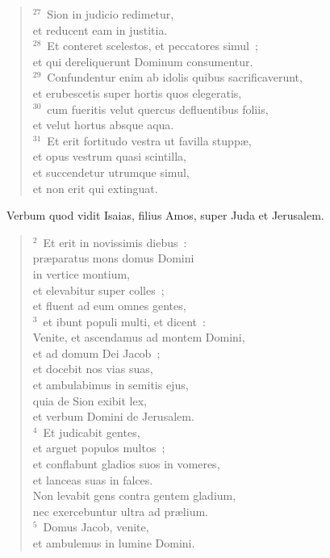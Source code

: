 \begin{flushleft}
\begin{verse}
${}^{27}$~Sion in judicio redimetur,\\ et reducent eam in justitia.\\
${}^{28}$~Et conteret scelestos, et peccatores simul~;\\ et qui dereliquerunt Dominum consumentur.\\
${}^{29}$~Confundentur enim ab idolis quibus sacrificaverunt,\\ et erubescetis super hortis quos elegeratis,\\
${}^{30}$~cum fueritis velut quercus defluentibus foliis,\\ et velut hortus absque aqua.\\
${}^{31}$~Et erit fortitudo vestra ut favilla stupp\ae ,\\ et opus vestrum quasi scintilla,\\ et succendetur utrumque simul,\\ et non erit qui extinguat.\end{verse}\end{flushleft}


~Verbum quod vidit Isaias, filius Amos, super Juda et Jerusalem.
\begin{flushleft}\begin{verse}\vspace{6pt}${}^{2}$~Et erit in novissimis diebus~:\\ pr\ae paratus mons domus Domini\\ in vertice montium,\\ et elevabitur super colles~;\\ et fluent ad eum omnes gentes,\\
${}^{3}$~et ibunt populi multi, et dicent~:\\ Venite, et ascendamus ad montem Domini,\\ et ad domum Dei Jacob~;\\ et docebit nos vias suas,\\ et ambulabimus in semitis ejus,\\ quia de Sion exibit lex,\\ et verbum Domini de Jerusalem.\\
${}^{4}$~Et judicabit gentes,\\ et arguet populos multos~;\\ et conflabunt gladios suos in vomeres,\\ et lanceas suas in falces.\\ Non levabit gens contra gentem gladium,\\ nec exercebuntur ultra ad pr\ae lium.\\
${}^{5}$~Domus Jacob, venite,\\ et ambulemus in lumine Domini.\end{verse}\end{flushleft}


